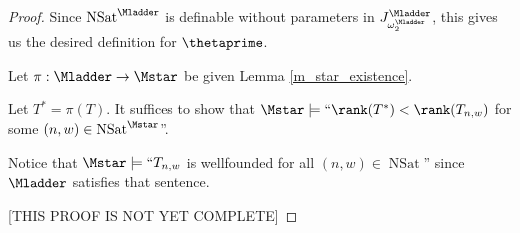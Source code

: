 \documentclass[oneside,12pt]{amsart}
\DeclareMathOperator{\NSat}{NSat}
\begin{document}
\begin{proof}
Since $\NSat^{\Mladder}$ is definable without parameters in
$J^{\Mladder}_{\omega_2^{\Mladder}}$, this gives us the desired definition for $\thetaprime$.

\begin{subproof}
\end{subproof}
Let $\pi:\Mladder\to\Mstar$ be given Lemma \ref{m_star_existence}.

Let $T^* = \pi(T)$. It suffices to show that
$\Mstar\models\text{``}\rank(T^*) < \rank(T_{n,w})$ for some $(n,w)\in \NSat^{\Mstar}$''.

Notice that $\Mstar\models\text{``}T_{n,w}$ is wellfounded for all $(n,w)\in \NSat$''
since $\Mladder$ satisfies that sentence.

[THIS PROOF IS NOT YET COMPLETE]
\end{proof}



\end{document}
